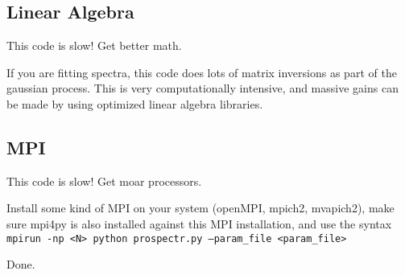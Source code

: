 \subsection{Linear Algebra}
This code is slow!  Get better math.

If you are fitting spectra, this code does lots of matrix inversions
as part of the gaussian process.  This is very computationally
intensive, and massive gains can be made by using optimized linear
algebra libraries.

\subsection{MPI}
This code is slow!  Get moar processors.

Install some kind of MPI on your system (openMPI, mpich2, mvapich2),
make sure mpi4py is also installed against this MPI installation, and
use the syntax \texttt{mpirun -np <N> python prospectr.py --param_file
<param_file>}

Done.



